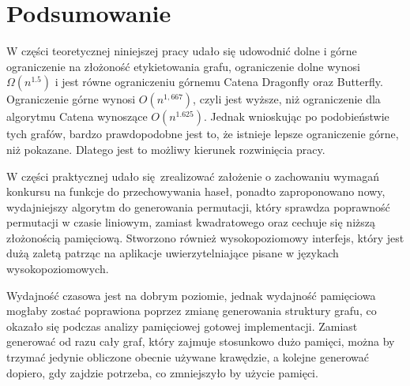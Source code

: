 \chapter{Podsumowanie}
\thispagestyle{chapterBeginStyle}
\label{podsumowanie}

W części teoretycznej niniejszej pracy udało się udowodnić dolne i górne ograniczenie na złożoność etykietowania grafu, ograniczenie dolne wynosi $\Omega(n^{1.5})$ i jest równe ograniczeniu górnemu Catena Dragonfly oraz Butterfly. Ograniczenie górne wynosi $O(n^{1,667})$, czyli jest wyższe, niż ograniczenie dla algorytmu Catena wynoszące $O(n^{1.625})$. Jednak wnioskując po podobieństwie tych grafów, bardzo prawdopodobne jest to, że istnieje lepsze ograniczenie górne, niż pokazane. Dlatego jest to możliwy kierunek rozwinięcia pracy.

W części praktycznej udało się zrealizować założenie o zachowaniu wymagań konkursu na funkcje do przechowywania haseł, ponadto zaproponowano nowy, wydajniejszy algorytm do generowania permutacji, który sprawdza poprawność permutacji w czasie liniowym, zamiast kwadratowego oraz cechuje się niższą złożonością pamięciową.
Stworzono również wysokopoziomowy interfejs, który jest dużą zaletą patrząc na aplikacje uwierzytelniające pisane w językach wysokopoziomowych.

Wydajność czasowa jest na dobrym poziomie, jednak wydajność pamięciowa mogłaby zostać poprawiona poprzez zmianę generowania struktury grafu, co okazało się podczas analizy pamięciowej gotowej implementacji. Zamiast generować od razu cały graf, który zajmuje stosunkowo dużo pamięci, można by trzymać jedynie obliczone obecnie używane krawędzie, a kolejne generować dopiero, gdy zajdzie potrzeba, co zmniejszyło by użycie pamięci.


